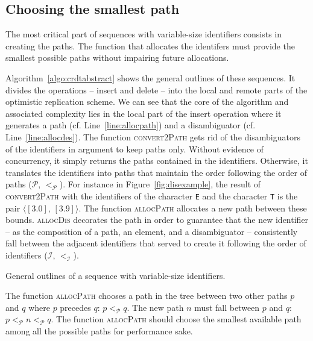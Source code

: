 \subsection{Choosing the smallest path}
\label{subsec:choosing}

The most critical part of sequences with variable-size identifiers consists in
creating the paths. The function that allocates the identifers must provide the
smallest possible paths without impairing future
allocations.

Algorithm~\ref{algo:crdtabstract} shows the general outlines of these
sequences. It divides the operations -- insert and delete -- into the local and
remote parts of the optimistic replication scheme. We can see that the core of
the algorithm and associated complexity lies in the local part of the insert
operation where it generates a path (cf. Line~\ref{line:allocpath}) and a
disambiguator (cf. Line~\ref{line:allocdes}). The function \textsc{convert2Path}
gets rid of the disambiguators of the identifiers in argument to keep paths
only. Without evidence of concurrency, it simply returns the paths contained in
the identifiers. Otherwise, it translates the identifiers into paths that
maintain the order following the order of paths
($\mathcal{P},\, <_{\mathcal{P}}$). For instance in Figure~\ref{fig:disexample},
the result of \textsc{convert2Path} with the identifiers of the character
\texttt{E} and the character \texttt{T} is the pair
$\langle [3.0],\, [3.9]\rangle$. The function \textsc{allocPath} allocates a new
path between these bounds.  \textsc{allocDis} decorates the path in order to
guarantee that the new identifier -- as the composition of a path, an element,
and a disambiguator -- consistently fall between the adjacent identifiers that
served to create it following the order of identifiers
($\mathcal{I}, \, <_\mathcal{I}$).

\begin{algorithm}[h]
  
  \caption{\label{algo:crdtabstract}General outlines of a sequence with
    variable-size identifiers.}
\end{algorithm}

The function \textsc{allocPath} chooses a path in the tree between two other paths
$p$ and $q$ where $p$ precedes $q$: $p<_{\mathcal{P}}q$. The new path $n$ must
fall between $p$ and $q$: $p<_\mathcal{P}n<_\mathcal{P}q$.
The function \textsc{allocPath} should choose the smallest available path among all
the possible paths for performance sake.

